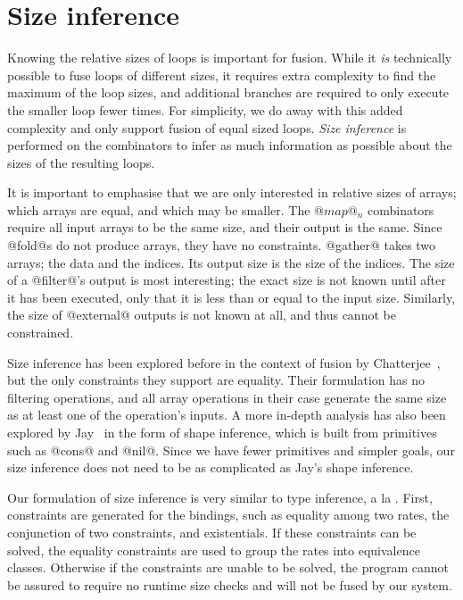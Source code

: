 \section{Size inference}

Knowing the relative sizes of loops is important for fusion.
While it \emph{is} technically possible to fuse loops of different sizes, it requires extra complexity to find the maximum of the loop sizes, and additional branches are required to only execute the smaller loop fewer times. For simplicity, we do away with this added complexity and only support fusion of equal sized loops. \emph{Size inference} is performed on the combinators to infer as much information as possible about the sizes of the resulting loops.

It is important to emphasise that we are only interested in relative sizes of arrays; which arrays are equal, and which may be smaller.
The $@map@_n$ combinators require all input arrays to be the same size, and their output is the same.
Since @fold@s do not produce arrays, they have no constraints.
@gather@ takes two arrays; the data and the indices. Its output size is the size of the indices.
The size of a @filter@'s output is most interesting; the exact size is not known until after it has been executed, only that it is less than or equal to the input size.
Similarly, the size of @external@ outputs is not known at all, and thus cannot be constrained.

Size inference has been explored before in the context of fusion by Chatterjee~\cite{chatterjee1991size}, but the only constraints they support are equality.
Their formulation has no filtering operations, and all array operations in their case generate the same size as at least one of the operation's inputs.
A more in-depth analysis has also been explored by Jay~\cite{jay1996shape} in the form of shape inference, which is built from primitives such as @cons@ and @nil@.
Since we have fewer primitives and simpler goals, our size inference does not need to be as complicated as Jay's shape inference.


Our formulation of size inference is very similar to type inference, a la \CITE.
First, constraints are generated for the bindings, such as equality among two rates, the conjunction of two constraints, and existentials.
If these constraints can be solved, the equality constraints are used to group the rates into equivalence classes.
Otherwise if the constraints are unable to be solved, the program cannot be assured to require no runtime size checks and will not be fused by our system.

